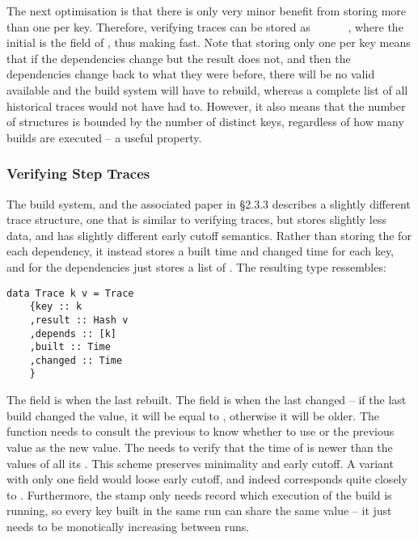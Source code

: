 The next optimisation is that there is only very minor benefit from storing more
than one  per key. Therefore, verifying traces can be stored as
~~~~~~, where the
initial  is the  field of , thus making 
fast. Note that storing only one  per key means that if the
dependencies change but the result does not, and then the dependencies change
back to what they were before, there will be no valid  available and
the build system will have to rebuild, whereas a complete list of all historical
traces would not have had to. However, it also means that the number of
 structures is bounded by the number of distinct keys, regardless of
how many builds are executed -- a useful property.

\subsubsection{Verifying Step Traces}\label{sec-step-traces}

The \Shake build system, and the associated paper \cite{mitchell2012shake} in \S2.3.3 describes a slightly different trace structure, one that is similar to verifying traces, but stores slightly less data, and has slightly different early cutoff semantics. Rather than storing the  for each dependency, it instead stores a built time and changed time for each key, and for the dependencies just stores a list of . The resulting  type ressembles:

\begin{verbatim}
data Trace k v = Trace
    {key :: k
    ,result :: Hash v
    ,depends :: [k]
    ,built :: Time
    ,changed :: Time
    }
\end{verbatim}

The  field is when the  last rebuilt. The  field is when the  last changed -- if the last build changed the value, it will be equal to , otherwise it will be older. The  function needs to consult the previous  to know whether to use  or the previous  value as the new  value. The  needs to verify that the  time of  is newer than the  values of all its . This scheme preserves minimality and early cutoff. A variant with only one  field would loose early cutoff, and indeed corresponds quite closely to \Make. Furthermore, the  stamp only needs record which execution of the build is running, so every key built in the same run can share the same  value -- it just needs to be monotically increasing between runs.

